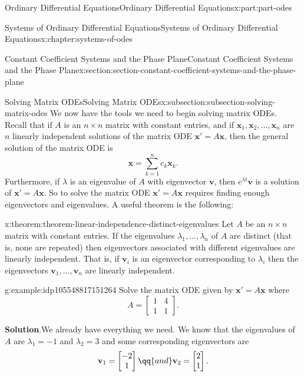\documentclass[twoside,10pt,]{book}
\newcommand{\blocktitlefont}{\relax}
\numberwithin{equation}{part}
\renewcommand{\vec}[1]{\mathbf{#1}}
\newcommand{\amp}{&}
\begin{document}
\begin{partptx}{Ordinary Differential Equations}{}{Ordinary Differential Equations}{}{}{x:part:part-odes}
\begin{chapterptx}{Systems of Ordinary Differential Equations}{}{Systems of Ordinary Differential Equations}{}{}{x:chapter:systems-of-odes}
\begin{sectionptx}{Constant Coefficient Systems and the Phase Plane}{}{Constant Coefficient Systems and the Phase Plane}{}{}{x:section:section-constant-coefficient-systems-and-the-phase-plane}
\begin{subsectionptx}{Solving Matrix ODEs}{}{Solving Matrix ODEs}{}{}{x:subsection:subsection-solving-matrix-odes}
We now have the tools we need to begin solving matrix ODEs. Recall that if \(A\) is an \(n\times n\) matrix with constant entries, and if \(\vec{x}_{1},\vec{x}_{2},\ldots,\vec{x}_{n}\) are \(n\) linearly independent solutions of the matrix ODE \(\vec{x}'=A\vec{x}\), then the general solution of the matrix ODE is%
\begin{equation*}
\vec{x} = \sum_{k=1}^{n}c_{k}\vec{x}_{k}.
\end{equation*}
Furthermore, if \(\lambda\) is an eigenvalue of \(A\) with eigenvector \(\vec{v}\), then \(e^{\lambda t}\vec{v}\) is a solution of \(\vec{x}'=A\vec{x}\). So to solve the matrix ODE \(\vec{x}'=A\vec{x}\) requires finding enough eigenvectors and eigenvalues. A useful theorem is the following:%
\begin{theorem}{}{}{x:theorem:theorem-linear-independence-distinct-eigenvalues}%
Let \(A\) be an \(n\times n\) matrix with constant entries. If the eigenvalues \(\lambda_{1},\ldots,\lambda_{n}\) of \(A\) are distinct (that is, none are repeated) then eigenvectors associated with different eigenvalues are linearly independent. That is, if \(\vec{v}_{i}\) is an eigenvector corresponding to \(\lambda_{i}\) then the eigenvectors \(\vec{v}_{1},\ldots,\vec{v}_{n}\) are linearly independent.%
\end{theorem}
\begin{example}{}{g:example:idp105548817151264}%
Solve the matrix ODE given by \(\vec{x}' = A\vec{x}\) where%
\begin{equation*}
A = \begin{bmatrix}1\amp 4\\1\amp 1\end{bmatrix}.
\end{equation*}
%
\par\smallskip%
\noindent\textbf{\blocktitlefont Solution}.\hypertarget{g:solution:idp105548817152544}{}\quad{}We already have everything we need. We know that the eigenvalues of \(A\) are \(\lambda_{1}=-1\) and \(\lambda_{2}=3\) and some corresponding eigenvectors are%
\begin{equation*}
\vec{v}_{1} = \begin{bmatrix}-2\\1\end{bmatrix}\qq{and} \vec{v}_{2} = \begin{bmatrix}2\\1\end{bmatrix}.
\end{equation*}

\end{example}
\end{subsectionptx}
\end{sectionptx}
\end{chapterptx}
\end{partptx}
\end{document}
